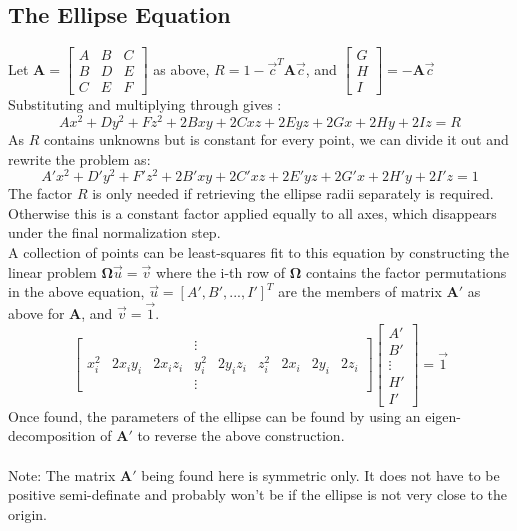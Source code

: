 \documentclass{article}
\def\mat#1{\mathbf{#1}}
\begin{document}
\subsection{The Ellipse Equation}
Let $\mat{A} = \left[ \begin{smallmatrix}
A & B & C \\
B & D & E \\
C & E & F
\end{smallmatrix} \right]$ as above, 
$R = 1 - \vec{c}^T\mat{A}\vec{c}$, and $\left[\begin{smallmatrix}
G\\H\\I \end{smallmatrix}\right] = -\mat{A}\vec{c}$
\\
Substituting and multiplying through gives :
\\
\begin{equation}
Ax^2 + Dy^2 + Fz^2 + 2Bxy + 2Cxz +2Eyz + 2Gx + 2Hy + 2Iz = R
\end{equation}
As $R$ contains unknowns but is constant for every point, we can divide it out and rewrite the problem as:
\begin{equation}
A'x^2 + D'y^2 + F'z^2 + 2B'xy + 2C'xz +2E'yz + 2G'x + 2H'y + 2I'z = 1
\end{equation}
The factor $R$ is only needed if retrieving the ellipse radii separately
is required. Otherwise this is a constant factor applied equally
to all axes, which disappears under the final normalization step.
\\
A collection of points can be least-squares fit to this equation
by constructing the linear problem
$\mat{\Omega}\vec{u} = \vec{v}$ where the i-th row of $\mat{\Omega}$ contains the factor permutations in
the above equation, $\vec{u} =
\left[A',B',...,I'\right]^T$ are the members of matrix $\mat{A}'$ as above for $\mat{A}$, and $\vec{v}=\vec{1}$.
\begin{equation}
\left[ \begin{matrix}
& & & \vdots \\
x_i^2 & 2x_iy_i & 2x_iz_i & y_i^2 & 2y_iz_i & z_i^2 & 2x_i & 2y_i & 2z_i \\
& & & \vdots  
\end{matrix}\right]
\left[ \begin{matrix} A'\\ B'\\ \vdots\\ H'\\ I' \end{matrix}\right] = \vec{1}
\end{equation}
Once found, the parameters of the ellipse can be found by using an 
eigen-decomposition of $\mat{A}'$ to reverse the above construction.
\\
\\
Note: The matrix $\mat{A'}$ being found here is symmetric only. It does
not have to be positive semi-definate and probably won't be if the
ellipse is not very close to the origin.
%
\end{document}

